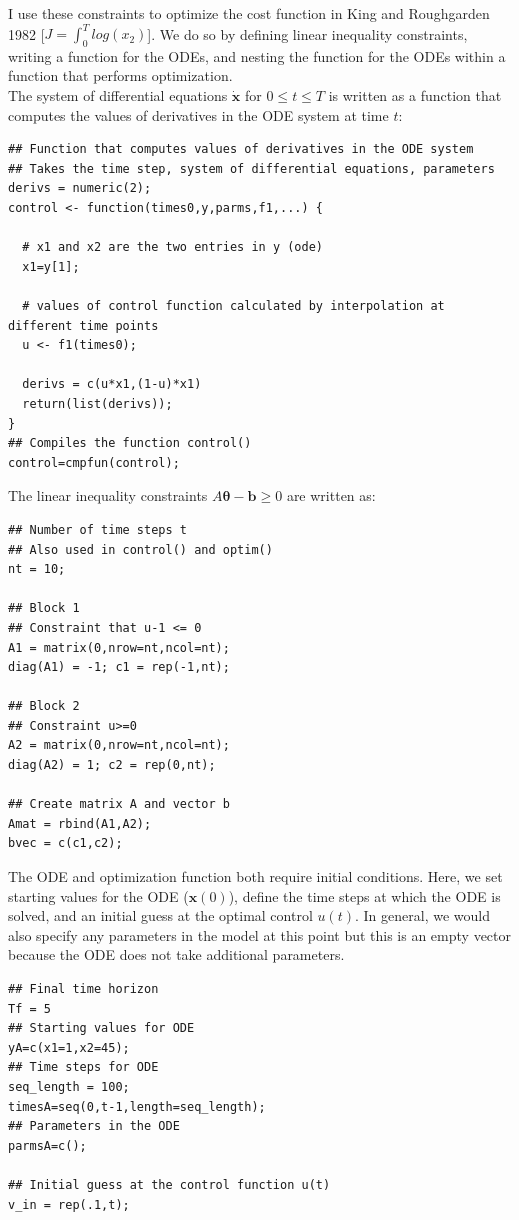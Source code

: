 \documentclass[12pt, oneside]{article}   	%
\begin{document}
\noindent I use these constraints to optimize the cost function in King and Roughgarden 1982 [$ J = \int_{0}^{T} log(x_2)$]. We do so by defining linear inequality constraints, writing a function for the ODEs, and nesting the function for the ODEs within a function that performs optimization. \\

\noindent The system of differential equations $\dot{\bm{x}}$ for $0\leq t \leq T$ is written as a function that computes the values of derivatives in the ODE system at time $t$:

\begin{lstlisting}
## Function that computes values of derivatives in the ODE system
## Takes the time step, system of differential equations, parameters
derivs = numeric(2); 
control <- function(times0,y,parms,f1,...) {
  
  # x1 and x2 are the two entries in y (ode)
  x1=y[1]; 
  
  # values of control function calculated by interpolation at different time points
  u <- f1(times0);
  
  derivs = c(u*x1,(1-u)*x1) 
  return(list(derivs));
}
## Compiles the function control()
control=cmpfun(control); 
\end{lstlisting}

\noindent The linear inequality constraints $A \bm{\theta} - \bm{b} \geq 0$ are written as:

\begin{lstlisting}
## Number of time steps t
## Also used in control() and optim()
nt = 10;

## Block 1
## Constraint that u-1 <= 0
A1 = matrix(0,nrow=nt,ncol=nt);
diag(A1) = -1; c1 = rep(-1,nt);

## Block 2
## Constraint u>=0
A2 = matrix(0,nrow=nt,ncol=nt);
diag(A2) = 1; c2 = rep(0,nt);

## Create matrix A and vector b
Amat = rbind(A1,A2);
bvec = c(c1,c2);

\end{lstlisting}

\noindent The ODE and optimization function both require initial conditions. Here, we set starting values for the ODE ($\bm{x}(0)$), define the time steps at which the ODE is solved, and an initial guess at the optimal control $u(t)$. In general, we would also specify any parameters in the model at this point but this is an empty vector because the ODE does not take additional parameters.

\begin{lstlisting}
## Final time horizon
Tf = 5
## Starting values for ODE
yA=c(x1=1,x2=45); 
## Time steps for ODE
seq_length = 100;
timesA=seq(0,t-1,length=seq_length);
## Parameters in the ODE
parmsA=c();

## Initial guess at the control function u(t)
v_in = rep(.1,t);

\end{lstlisting}
\end{document}
